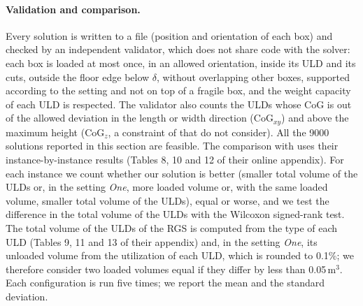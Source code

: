 \begin{table}[htbp]
\centering
\small\setlength{\tabcolsep}{4pt}
\caption{Parameters tuned with irace (training instances of the three settings, $t = 0.1$\,s).}
\label{tab:params}
\end{table}

\paragraph{Validation and comparison.}
Every solution is written to a file (position and orientation of each box) and checked by an
independent validator, which does not share code with the solver: each box is loaded at most
once, in an allowed orientation, inside its ULD and its cuts, outside the floor edge below
$\delta$, without overlapping other boxes, supported according to the setting and not on top
of a fragile box, and the weight capacity of each ULD is respected. The validator also counts
the ULDs whose CoG is out of the allowed deviation in the length or width direction (CoG$_{xy}$)
and above the maximum height (CoG$_z$, a constraint of \citet{Paquay2016} that
\citet{Hessler2025} do not consider). All the 9000 solutions reported in this section are
feasible.
The comparison with \citet{Hessler2025} uses their instance-by-instance results (Tables 8, 10
and 12 of their online appendix). For each instance we count whether our solution is better (smaller
total volume of the ULDs or, in the setting \emph{One}, more loaded volume or, with the same
loaded volume, smaller total volume of the ULDs), equal or worse, and we test the difference in
the total volume of the ULDs with the Wilcoxon signed-rank test. The total volume of the ULDs of
the RGS is computed from the type of each ULD (Tables 9, 11 and 13 of their appendix) and, in the
setting \emph{One}, its unloaded volume from the utilization of each ULD, which is rounded to
0.1\%; we therefore consider two loaded volumes equal if they differ by less than 0.05\,m$^3$.
Each configuration is run five times; we report the mean and the standard deviation.

